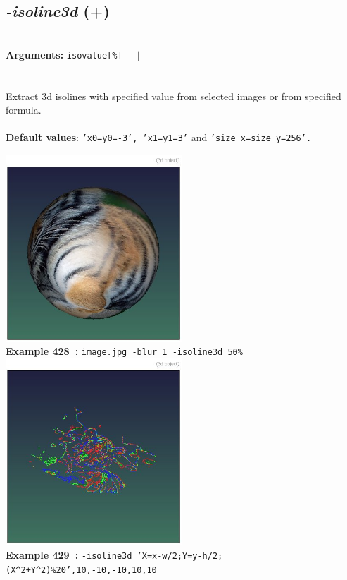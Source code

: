 \documentclass[a4paper,11pt,twoside]{book}
\begin{document}
\subsection{\emph{-isoline3d} (+)}\vspace*{-0.5em}
~\\\textbf{Arguments: } 
{\small \texttt{isovalue[\%]}}~~~$|$\\
\\~\\
Extract 3d isolines with specified value from selected images or from specified formula.
~\\~\\\textbf{Default values}: {\small \texttt{'x0=y0=-3', 'x1=y1=3'} and \texttt{'size\_x=size\_y=256'.}}
\begin{center}\includegraphics[keepaspectratio=true,height=7cm,width=\textwidth]{img/gmic_def428.jpg}\\
{\footnotesize \textbf{Example 428~:} \texttt{image.jpg -blur 1 -isoline3d 50\%}}
\\\includegraphics[keepaspectratio=true,height=7cm,width=\textwidth]{img/gmic_def429.jpg}\\
{\footnotesize \textbf{Example 429~:} \texttt{-isoline3d 'X=x-w/2;Y=y-h/2;(X\textasciicircum 2+Y\textasciicircum 2)\%20',10,-10,-10,10,10}}
\end{center}
\end{document}

